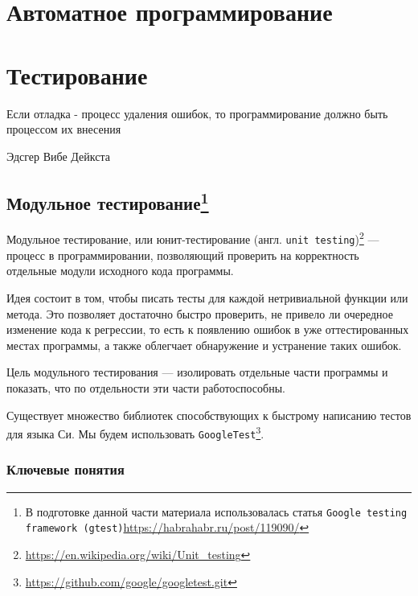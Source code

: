 \documentclass[12pt, twoside]{report}
\begin{document}
\newpage
\chapter*{Автоматное программирование}


\newpage
\chapter*{Тестирование}

\epigraph{Если отладка - процесс удаления ошибок, то программирование должно быть процессом их внесения}{Эдсгер Вибе Дейкста}

\section*{Модульное тестирование\footnote{В подготовке данной части материала использовалась статья \texttt{Google testing framework (gtest)}\url{https://habrahabr.ru/post/119090/}}}

Модульное тестирование, или юнит-тестирование (англ. \texttt{unit testing})\footnote{\url{ https://en.wikipedia.org/wiki/Unit_testing}} — процесс в программировании, 
позволяющий проверить на корректность отдельные модули исходного кода программы.

Идея состоит в том, чтобы писать тесты для каждой нетривиальной функции или метода. Это позволяет достаточно быстро проверить, 
не привело ли очередное изменение кода к регрессии, то есть к появлению ошибок в уже оттестированных местах программы, а также облегчает обнаружение и 
устранение таких ошибок.

Цель модульного тестирования — изолировать отдельные части программы и показать, что по отдельности эти части работоспособны.


Существует множество библиотек способствующих к быстрому написанию тестов для языка Си. Мы будем использовать \texttt{GoogleTest}\footnote{\url{ https://github.com/google/googletest.git}}.


\subsection*{Ключевые понятия}
\end{document}
